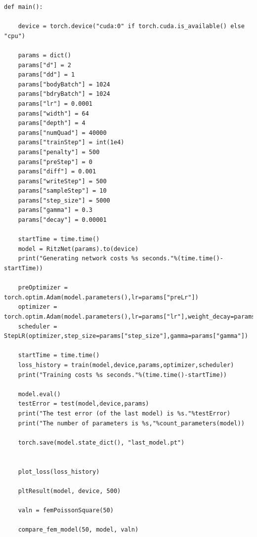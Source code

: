 \documentclass[a4paper,11pt,spanish, twoside, leqno]{tfg-uam}
\theoremstyle{definition}
\begin{document}
\begin{lstlisting}
def main():
    
    device = torch.device("cuda:0" if torch.cuda.is_available() else "cpu")

    params = dict()
    params["d"] = 2 
    params["dd"] = 1 
    params["bodyBatch"] = 1024 
    params["bdryBatch"] = 1024 
    params["lr"] = 0.0001 
    params["width"] = 64 
    params["depth"] = 4 
    params["numQuad"] = 40000 
    params["trainStep"] = int(1e4)
    params["penalty"] = 500
    params["preStep"] = 0
    params["diff"] = 0.001
    params["writeStep"] = 500
    params["sampleStep"] = 10
    params["step_size"] = 5000
    params["gamma"] = 0.3
    params["decay"] = 0.00001

    startTime = time.time()
    model = RitzNet(params).to(device)
    print("Generating network costs %s seconds."%(time.time()-startTime))

    preOptimizer = torch.optim.Adam(model.parameters(),lr=params["preLr"])
    optimizer = torch.optim.Adam(model.parameters(),lr=params["lr"],weight_decay=params["decay"])
    scheduler = StepLR(optimizer,step_size=params["step_size"],gamma=params["gamma"])

    startTime = time.time()
    loss_history = train(model,device,params,optimizer,scheduler)
    print("Training costs %s seconds."%(time.time()-startTime))

    model.eval()
    testError = test(model,device,params)
    print("The test error (of the last model) is %s."%testError)
    print("The number of parameters is %s,"%count_parameters(model))

    torch.save(model.state_dict(), "last_model.pt")

    
    plot_loss(loss_history)

    pltResult(model, device, 500)

    valn = femPoissonSquare(50)

    compare_fem_model(50, model, valn)
\end{lstlisting}
\end{document}
